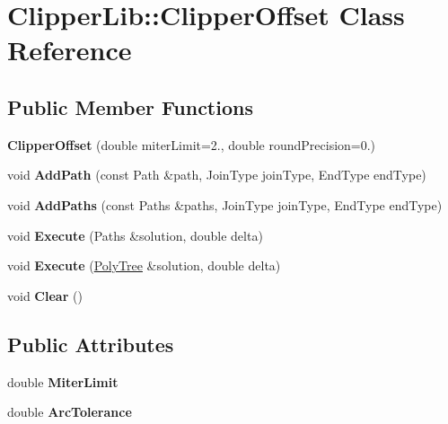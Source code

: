 \hypertarget{class_clipper_lib_1_1_clipper_offset}{}\section{Clipper\+Lib\+:\+:Clipper\+Offset Class Reference}
\label{class_clipper_lib_1_1_clipper_offset}
\subsection*{Public Member Functions}
\begin{DoxyCompactItemize}
\item 
\hypertarget{class_clipper_lib_1_1_clipper_offset_a45b4750989901db0c3865c374abdfcdc}{}\label{class_clipper_lib_1_1_clipper_offset_a45b4750989901db0c3865c374abdfcdc} 
{\bfseries Clipper\+Offset} (double miter\+Limit=2., double round\+Precision=0.)
\item 
\hypertarget{class_clipper_lib_1_1_clipper_offset_a0cd68e3690072f510924a5b25291043b}{}\label{class_clipper_lib_1_1_clipper_offset_a0cd68e3690072f510924a5b25291043b} 
void {\bfseries Add\+Path} (const Path \&path, Join\+Type join\+Type, End\+Type end\+Type)
\item 
\hypertarget{class_clipper_lib_1_1_clipper_offset_a18b35198f6370d76885af995ee2f16cb}{}\label{class_clipper_lib_1_1_clipper_offset_a18b35198f6370d76885af995ee2f16cb} 
void {\bfseries Add\+Paths} (const Paths \&paths, Join\+Type join\+Type, End\+Type end\+Type)
\item 
\hypertarget{class_clipper_lib_1_1_clipper_offset_ac591b25e483a52c99c3190a256ad4589}{}\label{class_clipper_lib_1_1_clipper_offset_ac591b25e483a52c99c3190a256ad4589} 
void {\bfseries Execute} (Paths \&solution, double delta)
\item 
\hypertarget{class_clipper_lib_1_1_clipper_offset_a3aaa9fcc20e503c967a23f1793536118}{}\label{class_clipper_lib_1_1_clipper_offset_a3aaa9fcc20e503c967a23f1793536118} 
void {\bfseries Execute} (\hyperlink{class_clipper_lib_1_1_poly_tree}{Poly\+Tree} \&solution, double delta)
\item 
\hypertarget{class_clipper_lib_1_1_clipper_offset_ab444433587b6a3f6c89655938d889c7d}{}\label{class_clipper_lib_1_1_clipper_offset_ab444433587b6a3f6c89655938d889c7d} 
void {\bfseries Clear} ()
\end{DoxyCompactItemize}
\subsection*{Public Attributes}
\begin{DoxyCompactItemize}
\item 
\hypertarget{class_clipper_lib_1_1_clipper_offset_a36b3bf4571e5b831edd584cbcb179246}{}\label{class_clipper_lib_1_1_clipper_offset_a36b3bf4571e5b831edd584cbcb179246} 
double {\bfseries Miter\+Limit}
\item 
\hypertarget{class_clipper_lib_1_1_clipper_offset_a6c1735720b06e6b92dc25891014b2a92}{}\label{class_clipper_lib_1_1_clipper_offset_a6c1735720b06e6b92dc25891014b2a92} 
double {\bfseries Arc\+Tolerance}
\end{DoxyCompactItemize}


